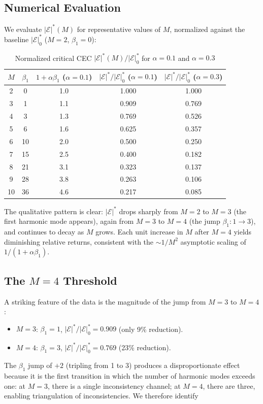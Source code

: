 \documentclass[12pt,a4paper]{article}
\theoremstyle{definition}
\theoremstyle{remark}
\theoremstyle{definition}
\newcommand{\CEC}{\mathcal{E}}
\newcommand{\CECstar}{|\CEC|^*}
\begin{document}
\subsection{Numerical Evaluation}

We evaluate $\CECstar(M)$ for representative values of $M$, normalized against the baseline $\CECstar_0$ ($M=2$, $\beta_1=0$):

\begin{table}[H]
  \centering
  \caption{Normalized critical CEC $\CECstar(M)/\CECstar_0$ for $\alpha = 0.1$ and $\alpha = 0.3$}
  \label{tab:cec_reduction}
  \begin{tabular}{@{}c c c c c@{}}
    \toprule
    $M$ & $\beta_1$ & $1+\alpha\beta_1$ ($\alpha=0.1$) & $\CECstar/\CECstar_0$ ($\alpha=0.1$) & $\CECstar/\CECstar_0$ ($\alpha=0.3$) \\
    \midrule
    2 & 0  & 1.0 & 1.000 & 1.000 \\
    3 & 1  & 1.1 & 0.909 & 0.769 \\
    4 & 3  & 1.3 & 0.769 & 0.526 \\
    5 & 6  & 1.6 & 0.625 & 0.357 \\
    6 & 10 & 2.0 & 0.500 & 0.250 \\
    7 & 15 & 2.5 & 0.400 & 0.182 \\
    8 & 21 & 3.1 & 0.323 & 0.137 \\
    9 & 28 & 3.8 & 0.263 & 0.106 \\
    10& 36 & 4.6 & 0.217 & 0.085 \\
    \bottomrule
  \end{tabular}
\end{table}

The qualitative pattern is clear: $\CECstar$ drops sharply from $M=2$ to $M=3$ (the first harmonic mode appears), again from $M=3$ to $M=4$ (the jump $\beta_1: 1 \to 3$), and continues to decay as $M$ grows. Each unit increase in $M$ after $M=4$ yields diminishing relative returns, consistent with the $\sim 1/M^2$ asymptotic scaling of $1/(1+\alpha\beta_1)$.

\subsection{The $M=4$ Threshold}

A striking feature of the data is the magnitude of the jump from $M=3$ to $M=4$:
\begin{itemize}[nosep]
  \item $M=3$: $\beta_1 = 1$, $\CECstar/\CECstar_0 = 0.909$ (only 9\% reduction).
  \item $M=4$: $\beta_1 = 3$, $\CECstar/\CECstar_0 = 0.769$ (23\% reduction).
\end{itemize}
The $\beta_1$ jump of $+2$ (tripling from 1 to 3) produces a disproportionate effect because it is the first transition in which the number of harmonic modes exceeds one: at $M=3$, there is a single inconsistency channel; at $M=4$, there are three, enabling triangulation of inconsistencies. We therefore identify
\end{document}
